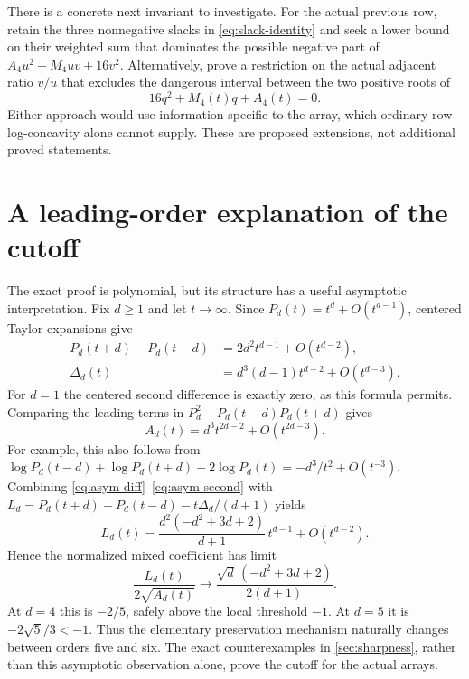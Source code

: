 \documentclass[11pt,a4paper]{article}
\numberwithin{equation}{section}
\theoremstyle{definition}
\theoremstyle{remark}
\begin{document}
There is a concrete next invariant to investigate. For the actual previous
row, retain the three nonnegative slacks in \eqref{eq:slack-identity}
and seek a lower bound on their weighted sum that dominates the possible
negative part of $A_4u^2+M_4uv+16v^2$. Alternatively, prove a restriction
on the actual adjacent ratio $v/u$ that excludes the dangerous interval
between the two positive roots of
\[
 16q^2+M_4(t)q+A_4(t)=0.
\]
Either approach would use information specific to the array, which
ordinary row log-concavity alone cannot supply. These are proposed
extensions, not additional proved statements.

\section{A leading-order explanation of the cutoff}\label{sec:asymptotics}

The exact proof is polynomial, but its structure has a useful asymptotic
interpretation. Fix $d\ge1$ and let $t\to\infty$. Since
$P_d(t)=t^d+O(t^{d-1})$, centered Taylor expansions give
\begin{align}
 P_d(t+d)-P_d(t-d)&=2d^2t^{d-1}+O(t^{d-2}),\label{eq:asym-diff}\\
 \Delta_d(t)&=d^3(d-1)t^{d-2}+O(t^{d-3}).\label{eq:asym-second}
\end{align}
For $d=1$ the centered second difference is exactly zero, as this formula
permits. Comparing the leading terms in $P_d^2-P_d(t-d)P_d(t+d)$ gives
\begin{equation}\label{eq:asym-A}
 A_d(t)=d^3t^{2d-2}+O(t^{2d-3}).
\end{equation}
For example, this also follows from
$\log P_d(t-d)+\log P_d(t+d)-2\log P_d(t)
=-d^3/t^2+O(t^{-3})$.
Combining \eqref{eq:asym-diff}--\eqref{eq:asym-second} with
$L_d=P_d(t+d)-P_d(t-d)-t\Delta_d/(d+1)$ yields
\begin{equation}\label{eq:asym-L}
 L_d(t)=\frac{d^2(-d^2+3d+2)}{d+1}\,t^{d-1}+O(t^{d-2}).
\end{equation}
Hence the normalized mixed coefficient has limit
\begin{equation}\label{eq:asym-subset-ratio}
 \frac{L_d(t)}{2\sqrt{A_d(t)}}
 \longrightarrow \frac{\sqrt d\,(-d^2+3d+2)}{2(d+1)}.
\end{equation}
At $d=4$ this is $-2/5$, safely above the local threshold $-1$.
At $d=5$ it is $-2\sqrt5/3<-1$. Thus the elementary preservation
mechanism naturally changes between orders five and six. The exact
counterexamples in \cref{sec:sharpness}, rather than this asymptotic
observation alone, prove the cutoff for the actual arrays.
\end{document}
